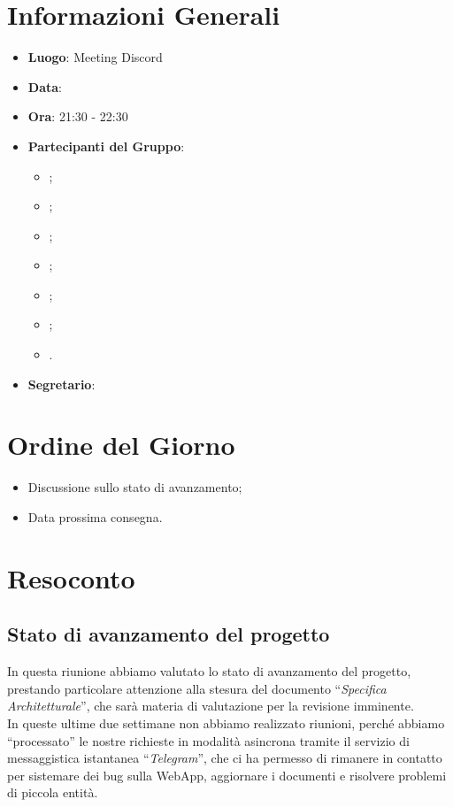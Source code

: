 \section{Informazioni Generali}

\begin{itemize}
	\item{\textbf{Luogo}}: Meeting Discord
	\item{\textbf{Data}}: \D
	\item{\textbf{Ora}}: 21:30 - 22:30
	\item{\textbf{Partecipanti del Gruppo}}:
	\begin{itemize}
		\item{\EP{};}
		\item{\FP{};}
		\item{\GC{};}
		\item{\LW{};}
		\item{\MB{};}
		\item{\MG{};}
		\item{\PV{}.}
	\end{itemize}
	\item{\textbf{Segretario}}: \GC{}
\end{itemize}

\section{Ordine del Giorno}
\begin{itemize}
	\item{Discussione sullo stato di avanzamento;}
	\item{Data prossima consegna.}
\end{itemize}

\section{Resoconto}

\subsection{Stato di avanzamento del progetto}

In questa riunione abbiamo valutato lo stato di avanzamento del progetto, prestando particolare attenzione alla stesura del documento “\textit{Specifica Architetturale}”, che sarà materia di valutazione per la revisione imminente.
\\
In queste ultime due settimane non abbiamo realizzato riunioni, perché abbiamo “processato” le nostre richieste in modalità asincrona tramite il servizio di messaggistica istantanea “\textit{Telegram}”, che ci ha permesso di rimanere in contatto per sistemare dei bug sulla WebApp, aggiornare i documenti e risolvere problemi di piccola entità. 

